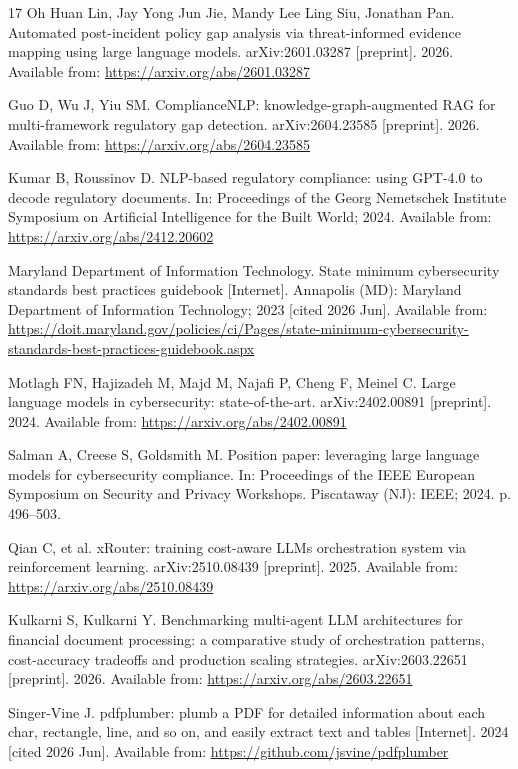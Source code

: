 \begin{thebibliography}{17}
Oh Huan Lin, Jay Yong Jun Jie, Mandy Lee Ling Siu, Jonathan Pan. Automated
post-incident policy gap analysis via threat-informed evidence mapping using
large language models. arXiv:2601.03287 [preprint]. 2026. Available from:
\url{https://arxiv.org/abs/2601.03287}

Guo D, Wu J, Yiu SM. ComplianceNLP: knowledge-graph-augmented RAG for
multi-framework regulatory gap detection. arXiv:2604.23585 [preprint]. 2026.
Available from: \url{https://arxiv.org/abs/2604.23585}

Kumar B, Roussinov D. NLP-based regulatory compliance: using GPT-4.0 to decode
regulatory documents. In: Proceedings of the Georg Nemetschek Institute
Symposium on Artificial Intelligence for the Built World; 2024. Available from:
\url{https://arxiv.org/abs/2412.20602}

Maryland Department of Information Technology. State minimum cybersecurity
standards best practices guidebook [Internet]. Annapolis (MD): Maryland
Department of Information Technology; 2023 [cited 2026 Jun]. Available from:
\url{https://doit.maryland.gov/policies/ci/Pages/state-minimum-cybersecurity-standards-best-practices-guidebook.aspx}

Motlagh FN, Hajizadeh M, Majd M, Najafi P, Cheng F, Meinel C. Large language
models in cybersecurity: state-of-the-art. arXiv:2402.00891 [preprint]. 2024.
Available from: \url{https://arxiv.org/abs/2402.00891}

Salman A, Creese S, Goldsmith M. Position paper: leveraging large language
models for cybersecurity compliance. In: Proceedings of the IEEE European
Symposium on Security and Privacy Workshops. Piscataway (NJ): IEEE; 2024.
p. 496--503.

Qian C, et al. xRouter: training cost-aware LLMs orchestration system via
reinforcement learning. arXiv:2510.08439 [preprint]. 2025. Available from:
\url{https://arxiv.org/abs/2510.08439}

Kulkarni S, Kulkarni Y. Benchmarking multi-agent LLM architectures for financial
document processing: a comparative study of orchestration patterns,
cost-accuracy tradeoffs and production scaling strategies. arXiv:2603.22651
[preprint]. 2026. Available from: \url{https://arxiv.org/abs/2603.22651}

Singer-Vine J. pdfplumber: plumb a PDF for detailed information about each char,
rectangle, line, and so on, and easily extract text and tables [Internet]. 2024
[cited 2026 Jun]. Available from: \url{https://github.com/jsvine/pdfplumber}


\end{thebibliography}
